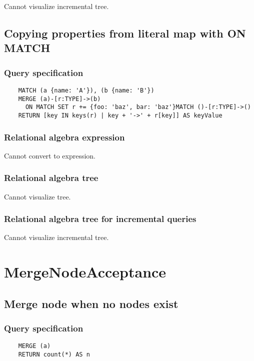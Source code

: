 	Cannot visualize incremental tree.
	\subsection{Copying properties from literal map with ON MATCH}

	\subsubsection*{Query specification}

	\begin{lstlisting}
	MATCH (a {name: 'A'}), (b {name: 'B'})
	MERGE (a)-[r:TYPE]->(b)
	  ON MATCH SET r += {foo: 'baz', bar: 'baz'}MATCH ()-[r:TYPE]->()
	RETURN [key IN keys(r) | key + '->' + r[key]] AS keyValue
	\end{lstlisting}


	\subsubsection*{Relational algebra expression}

	Cannot convert to expression.

	\subsubsection*{Relational algebra tree}

	Cannot visualize tree.

	\subsubsection*{Relational algebra tree for incremental queries}

	Cannot visualize incremental tree.

	\section{MergeNodeAcceptance}

	\subsection{Merge node when no nodes exist}

	\subsubsection*{Query specification}

	\begin{lstlisting}
	MERGE (a)
	RETURN count(*) AS n
	\end{lstlisting}


